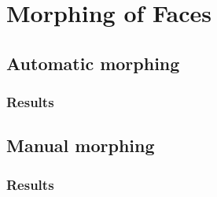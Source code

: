 \section{Morphing of Faces}
\subsection{Automatic morphing}

\subsubsection{Results}

\subsection{Manual morphing}

\subsubsection{Results}
